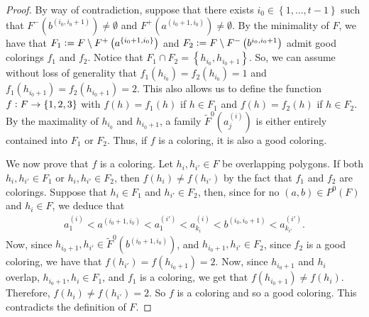 \documentclass[12pt]{article}
\theoremstyle{definition}
\newcommand{\defeq}{\vcentcolon=}
\begin{document}
\begin{proof}
         By way of contradiction,
         suppose that there exists
         $i_0 \in \left\{1, \ldots, t-1\right\}$
         such that $F^{-}\left(b^{\left(i_0, i_0+1\right)}\right)
         \neq \emptyset$ and
         $F^{+}\left(a^{\left(i_0+1, i_0\right)}\right)
         \neq \emptyset$.
         By the minimality of $F$, 
         we have that
         $F_1 \defeq F \setminus F^{+}
         \left(a^{\left\{i_0+1, i_0\right\}}\right)$
         and
         $F_2 \defeq F \setminus F^{-}
         \left(b^{i_0,i_0+1}\right)$ 
         admit good colorings
         $f_1$ and $f_2$.
         Notice that $F_1 \cap F_2 = 
         \left\{h_{i_0}, h_{i_0+1}\right\}$.
         So, we can assume without loss
         of generality that
         $f_1\left(h_{i_0}\right) = 
         f_2\left(h_{i_0}\right) = 1$ 
         and $f_1\left(h_{i_0+1}\right) =
         f_2\left(h_{i_0+1}\right) =2$.
         This also allows us to define 
         the function $f \vcentcolon 
         F \rightarrow \left\{1, 2, 3\right\}$ 
         with $f\left(h\right) = f_1\left(h\right)$ 
         if $h \in F_1$ and 
         $f\left(h\right) = f_2\left(h\right)$ 
         if $h \in F_2$.
         By the maximality
         of $h_{i_0}$ and $h_{i_0+1}$,
         a family
         $\widetilde{F}^{0}\left(a_{j}^{\left(i\right)}\right)$
         is either entirely contained
         into $F_1$ or $F_2$.
         Thus, if $f$ is a coloring,
         it is also a good coloring.

         We now prove that $f$ is a coloring.
         Let $h_{i}, h_{i'} \in F$ be overlapping
         polygons. If both $h_{i}, h_{i'} \in F_1$ 
         or $h_{i}, h_{i'} \in F_2$, then 
         $f\left(h_{i}\right) \neq f\left(h_{i'}\right)$
         by the fact that $f_1$ and $f_2$ 
         are colorings.
         Suppose that $h_{i} \in F_1$ and
         $h_{i'} \in F_2$, then, since for no
         $\left(a, b\right) \in P^{0}\left(F\right)$ 
         and $h_{i} \in F$, we deduce that
         \begin{gather*}
             a_1^{\left(i\right)} < 
             a^{\left(i_0+1, i_0\right)} <
             a_1^{\left(i'\right)} < 
             a_{k_{i}}^{\left(i\right)} < 
             b^{\left(i_0, i_0+1\right)} < 
             a_{k_{i'}}^{\left(i'\right)}.
         \end{gather*}
         Now, since $h_{i_0+1}, h_{i'} \in 
         \widetilde{F}^{0}\left(b^{\left(i_0+1, i_0\right)}\right)$,
         and $h_{i_0+1}, h_{i'} \in F_2$,
         since $f_2$ is a good
         coloring, we have that $f\left(h_{i'}\right) =
         f\left(h_{i_0+1}\right) = 2$.
         Now, since $h_{i_0+1}$ and $h_{i}$ 
         overlap, 
         $h_{i_0+1}, h_{i} \in F_1$,
         and $f_1$ is a coloring, we get
         that $f\left(h_{i_0+1}\right) \neq
         f\left(h_{i}\right)$.
         Therefore, $f\left(h_{i}\right) \neq 
         f\left(h_{i'}\right) = 2$.
         So $f$ is a coloring and so
         a good coloring.
         This contradicts the definition
         of $F$.


\end{proof}
\end{document}
